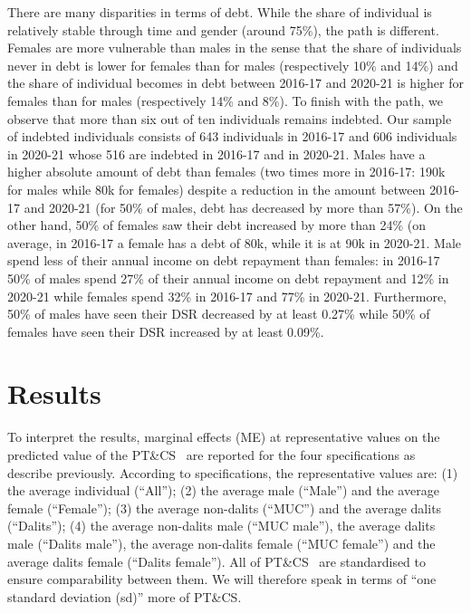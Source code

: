 \documentclass[a4paper, 11pt, onecolumn]{article}
\newcommand{\PTCS}{PT\&CS}
\begin{document}
There are many disparities in terms of debt.
While the share of individual is relatively stable through time and gender (around 75\%), the path is different.
Females are more vulnerable than males in the sense that the share of individuals never in debt is lower for females than for males (respectively 10\% and 14\%) and the share of individual becomes in debt between 2016-17 and 2020-21 is higher for females than for males (respectively 14\% and 8\%).
To finish with the path, we observe that more than six out of ten individuals remains indebted.
Our sample of indebted individuals consists of 643 individuals in 2016-17 and 606 individuals in 2020-21 whose 516 are indebted in 2016-17 and in 2020-21.
Males have a higher absolute amount of debt than females (two times more in 2016-17: \rupee190k for males while \rupee80k for females) despite a reduction in the amount between 2016-17 and 2020-21 (for 50\% of males, debt has decreased by more than 57\%).
On the other hand, 50\% of females saw their debt increased by more than 24\% (on average, in 2016-17 a female has a debt of \rupee80k, while it is at \rupee90k in 2020-21.
Male spend less of their annual income on debt repayment than females: in 2016-17 50\% of males spend 27\% of their annual income on debt repayment and 12\% in 2020-21 while females spend 32\% in 2016-17 and 77\% in 2020-21.
Furthermore, 50\% of males have seen their DSR decreased by at least 0.27\% while 50\% of females have seen their DSR increased by at least 0.09\%.








\section{Results}
\label{section:results}

To interpret the results, marginal effects (ME) at representative values on the predicted value of the \PTCS~ are reported for the four specifications as describe previously.
According to specifications, the representative values are: (1) the average individual (``All''); (2) the average male (``Male'') and the average female (``Female''); (3) the average non-dalits (``MUC'') and the average dalits (``Dalits''); (4) the average non-dalits male (``MUC male''), the average dalits male (``Dalits male''), the average non-dalits female (``MUC female'') and the average dalits female (``Dalits female'').
All of \PTCS~ are standardised to ensure comparability between them.
We will therefore speak in terms of ``one standard deviation (sd)'' more of \PTCS.
\end{document}
